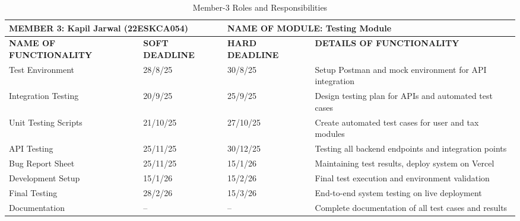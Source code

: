\begin{table}[H]
\begin{center}
 \begin{tabular}{| m{4cm} | m{2.5cm} | m{2.5cm}| m{5cm}| } 
\hline
\multicolumn{2}{|l|}{MEMBER 3: Kapil Jarwal (22ESKCA054)}&
\multicolumn{2}{|l|}{NAME OF MODULE: Testing Module}\\
\hline
\textbf{NAME OF FUNCTIONALITY} & \textbf{SOFT DEADLINE} & \textbf{HARD DEADLINE} & \textbf{DETAILS OF FUNCTIONALITY} \\ 
\hline
Test Environment & 28/8/25 & 30/8/25 & Setup Postman and mock environment for API integration \\
\hline
Integration Testing & 20/9/25 & 25/9/25 & Design testing plan for APIs and automated test cases \\
\hline
Unit Testing Scripts & 21/10/25 & 27/10/25 & Create automated test cases for user and tax modules \\
\hline
API Testing & 25/11/25 & 30/12/25 & Testing all backend endpoints and integration points \\
\hline
Bug Report Sheet & 25/11/25 & 15/1/26 & Maintaining test results, deploy system on Vercel \\
\hline
Development Setup & 15/1/26 & 15/2/26 & Final test execution and environment validation \\
\hline
Final Testing & 28/2/26 & 15/3/26 & End-to-end system testing on live deployment \\
\hline
Documentation & -- & -- & Complete documentation of all test cases and results \\
\hline
\end{tabular}
\caption{Member-3 Roles and Responsibilities}
\end{center}
\end{table}

